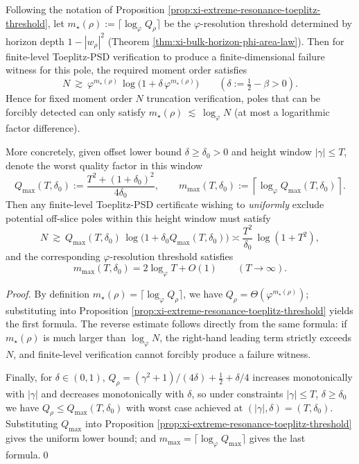 \begin{corollary}\label{cor:xi-toeplitz-height-phi-calibration}
Following the notation of Proposition \ref{prop:xi-extreme-resonance-toeplitz-threshold}, let
\(
m_\star(\rho):=\lceil\log_{\varphi}Q_\rho\rceil
\)
be the \(\varphi\)-resolution threshold determined by horizon depth \(1-|w_\rho|^2\) (Theorem \ref{thm:xi-bulk-horizon-phi-area-law}).
Then for finite-level Toeplitz-PSD verification to produce a finite-dimensional failure witness for this pole, the required moment order satisfies
\[
N\ \gtrsim\ \varphi^{m_\star(\rho)}\,\log\!\bigl(1+\delta\,\varphi^{m_\star(\rho)}\bigr)
\qquad(\delta:=\tfrac12-\beta>0).
\]
Hence for fixed moment order \(N\) truncation verification, poles that can be forcibly detected can only satisfy
\(
m_\star(\rho)\ \lesssim\ \log_{\varphi}N
\)
(at most a logarithmic factor difference).
\par
More concretely, given offset lower bound \(\delta\ge\delta_0>0\) and height window \(|\gamma|\le T\), denote the worst quality factor in this window
\[
Q_{\max}(T,\delta_0):=\frac{T^2+(1+\delta_0)^2}{4\delta_0},
\qquad
m_{\max}(T,\delta_0):=\left\lceil\log_{\varphi}Q_{\max}(T,\delta_0)\right\rceil.
\]
Then any finite-level Toeplitz-PSD certificate wishing to \emph{uniformly} exclude potential off-slice poles within this height window must satisfy
\[
N\ \gtrsim\ Q_{\max}(T,\delta_0)\,\log\!\bigl(1+\delta_0 Q_{\max}(T,\delta_0)\bigr)
\asymp \frac{T^2}{\delta_0}\,\log(1+T^2),
\]
and the corresponding \(\varphi\)-resolution threshold satisfies
\[
m_{\max}(T,\delta_0)=2\log_{\varphi}T+O(1)\qquad(T\to\infty).
\]
\end{corollary}
\begin{proof}
By definition \(m_\star(\rho)=\lceil\log_{\varphi}Q_\rho\rceil\), we have \(Q_\rho=\Theta(\varphi^{m_\star(\rho)})\); substituting into Proposition \ref{prop:xi-extreme-resonance-toeplitz-threshold} yields the first formula.
The reverse estimate follows directly from the same formula: if \(m_\star(\rho)\) is much larger than \(\log_\varphi N\), the right-hand leading term strictly exceeds \(N\), and finite-level verification cannot forcibly produce a failure witness.
\par
Finally, for \(\delta\in(0,1)\),
\(
Q_\rho=(\gamma^2+1)/(4\delta)+\tfrac12+\delta/4
\)
increases monotonically with \(|\gamma|\) and decreases monotonically with \(\delta\), so under constraints \(|\gamma|\le T\), \(\delta\ge\delta_0\) we have
\(
Q_\rho\le Q_{\max}(T,\delta_0)
\)
with worst case achieved at \((|\gamma|,\delta)=(T,\delta_0)\).
Substituting \(Q_{\max}\) into Proposition \ref{prop:xi-extreme-resonance-toeplitz-threshold} gives the uniform lower bound; and \(m_{\max}=\lceil\log_\varphi Q_{\max}\rceil\) gives the last formula.\qed
\end{proof}

